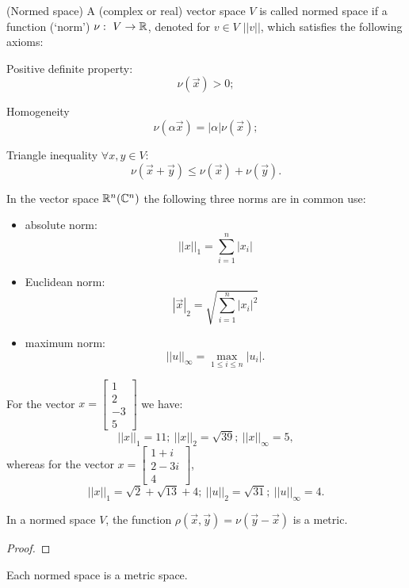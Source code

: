 \begin{definition}{(Normed space)}{}
    A (complex or real) vector space $V$ is called normed space if a function (`norm') $\nu: \ V \to \mathbb{R}$, denoted for $v \in V$ $||v||$, which satisfies the following axioms:
    \begin{enumerate*}
        \item Positive definite property:
        \[ 
            \nu\left(\vec{x}\right) > 0;
        \]
        \item Homogeneity \[
            \nu\left(\alpha \vec{x}\right) = |\alpha|\nu\left(\vec{x}\right);
        \]
        \item Triangle inequality $\forall x, y \in V$:
        \[ 
            \nu\left(\vec{x} + \vec{y}\right) \leq \nu\left(\vec{x}\right) + \nu\left(\vec{y}\right).
        \]
    \end{enumerate*}
\end{definition}
\begin{note}{}{}
    In the vector space $\mathbb{R}^n (\mathbb{C}^n)$ the following three norms are in common use:
    \begin{itemize}
        \item absolute norm:
        \[
            ||x||_1 = \sum\limits_{i=1}^n |x_i|  
        \]
        \item Euclidean norm:
        \[
            \left|\vec{x}\right|_2 = \sqrt{\sum\limits_{i=1}^n |x_i|^2}    
        \]
        \item maximum norm:
        \[
            ||u||_\infty = \max\limits_{1 \leq i \leq n} |u_i|.  
        \]
    \end{itemize}
\end{note}

\Ex For the vector $x = \begin{bmatrix}
    1 \\
    2 \\ 
    -3 \\
    5
\end{bmatrix}$ we have:
\[
    ||x||_1 = 11; \ ||x||_2 = \sqrt{39}; \ ||x||_\infty = 5, 
\]
whereas for the vector $x = \begin{bmatrix}
    1+i \\
    2-3i\\
    4
\end{bmatrix}$,
\[
    ||x||_1 = \sqrt{2} + \sqrt{13} + 4; \ ||u||_2 = \sqrt{31}; \ ||u||_\infty = 4.  
\]

\begin{proposition}{}{}
    In a normed space $V$, the function $\rho\left(\vec{x},\vec{y}\right) = \nu\left(\vec{y} - \vec{x}\right)$ is a metric.
\end{proposition}
\begin{proof}
    
\end{proof}
\begin{note}{}{}
    Each normed space is a metric space.
\end{note}
